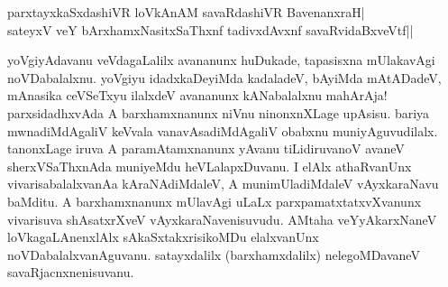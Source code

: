 \begin{shloka}
parxtayxkaSxdashiVR loVkAnAM savaRdashiVR BavenanxraH|\\
sateyxV veY bArxhamxNasitxSaThxnf tadivxdAvxnf savaRvidaBxveVtf||
\end{shloka}

yoVgiyAdavanu veVdagaLalilx avananunx huDukade, tapasisxna mUlakavAgi noVDabalalxnu. yoVgiyu idadxkaDeyiMda kadaladeV, bAyiMda mAtADadeV, mAnasika ceVSeTxyu ilalxdeV avananunx kANabalalxnu mahArAja! parxsidadhxvAda A barxhamxnanunx niVnu ninonxnXLage upAsisu. bariya mwnadiMdAgaliV keVvala vanavAsadiMdAgaliV obabxnu muniyAguvudilalx. tanonxLage iruva A paramAtamxnanunx yAvanu tiLidiruvanoV avaneV sherxVSaThxnAda muniyeMdu heVLalapxDuvanu. I elAlx athaRvanUnx vivarisabalalxvanAa kAraNAdiMdaleV, A munimUladiMdaleV vAyxkaraNavu baMditu. A barxhamxnanunx mUlavAgi uLaLx parxpamatxtatxvXvanunx vivarisuva shAsatxrXveV vAyxkaraNavenisuvudu. AMtaha veYyAkarxNaneV loVkagaLAnenxlAlx sAkaSxtakxrisikoMDu elalxvanUnx noVDabalalxvanAguvanu. satayxdalilx (barxhamxdalilx) nelegoMDavaneV savaRjacnxnenisuvanu.
